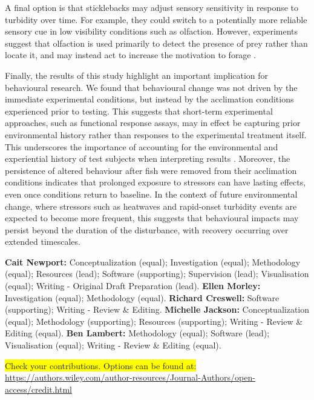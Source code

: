 \documentclass[ASNA,twocolumn]{USG} %
\begin{document}
A final option is that sticklebacks may adjust sensory sensitivity in response to turbidity over time. For example, they could switch to a potentially more reliable sensory cue in low visibility conditions such as olfaction. However, experiments suggest that olfaction is used primarily to detect the presence of prey rather than locate it, and may instead act to increase the motivation to forage \citep{johannesenOlfactoryCueUse2012}.

Finally, the results of this study highlight an important implication for behavioural research. We found that behavioural change was not driven by the immediate experimental conditions, but instead by the acclimation conditions experienced prior to testing. This suggests that short-term experimental approaches, such as functional response assays, may in effect be capturing prior environmental history rather than responses to the experimental treatment itself. This underscores the importance of accounting for the environmental and experiential history of test subjects when interpreting results \citep{corderyDifferentialCaptivityExperiential2026}. Moreover, the persistence of altered behaviour after fish were removed from their acclimation conditions indicates that prolonged exposure to stressors can have lasting effects, even once conditions return to baseline. In the context of future environmental change, where stressors such as heatwaves and rapid-onset turbidity events are expected to become more frequent, this suggests that behavioural impacts may persist beyond the duration of the disturbance, with recovery occurring over extended timescales. 


{}

\textbf{Cait Newport:} Conceptualization (equal); Investigation (equal); Methodology (equal); Resources (lead); Software (supporting); Supervision (lead); Visualisation (equal); Writing - Original Draft Preparation (lead). \textbf{Ellen Morley:} Investigation (equal); Methodology (equal). \textbf{Richard Creswell:} Software (supporting); Writing - Review \& Editing. \textbf{Michelle Jackson:} Conceptualization (equal); Methodology (supporting); Resources (supporting); Writing - Review \& Editing (equal). \textbf{Ben Lambert:} Methodology (equal); Software (lead); Visualisation (equal); Writing - Review \& Editing (equal).

\colorbox{yellow}{Check your contributions. Options can be found at:} \hyperlink{yellow}{https://authors.wiley.com/author-resources/Journal-Authors/open-access/credit.html}
\end{document}
